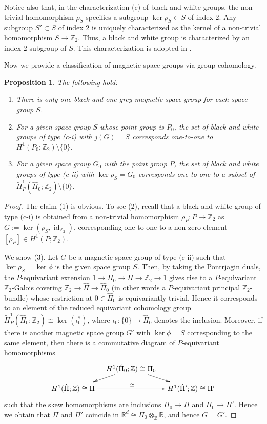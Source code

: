 \documentclass[11pt]{amsart}
\theoremstyle{definition}
\theoremstyle{plain}
\newtheorem{prp}[equation]{Proposition}
\theoremstyle{remark}
\DeclareMathOperator{\id}{id}
\newcommand{\bR}{\mathbb{R}}
\newcommand{\bZ}{\mathbb{Z}}
\begin{document}
Notice also that, in the characterization (c) of black and white groups, the non-trivial homomorphism $\rho_{S}$ specifies a subgroup $\ker\rho_S \subset S$ of index $2$. Any subgroup $S' \subset S$ of index $2$ is uniquely characterized as the kernel of a non-trivial homomorphism $S \to \bZ_2$. Thus, a black and white group is characterized by an index $2$ subgroup of $S$. This characterization is adopted in \cite{schwarzenbergerColourSymmetry1984}.

Now we provide a classification of magnetic space groups via group cohomology. 

\begin{prp}\label{prop:magnetic.class}
The following hold:
\begin{enumerate}
    \item There is only one black and one grey magnetic space group for each space group $S$.
    \item For a given space group $S$ whose point group is $P_0$, the set of black and white groups of type (c-i) with $j(G)=S$ corresponds one-to-one to $H^1(P_0;\bZ_2) \setminus \{ 0 \} $. 
    \item For a given space group $G_0$ with the point group $P$, the set of black and white groups of type (c-ii) with $\ker \rho_S =G_0$ corresponds one-to-one to a subset of $\tilde{H}^1_P(\hat{\Pi}_0; \bZ_2)\setminus \{0\}$.
\end{enumerate}
\end{prp}
\begin{proof}
The claim (1) is obvious. To see (2), recall that a black and white group of type (c-i) is obtained from a non-trivial homomorphism $\rho_P \colon P \to \bZ_2$ as $G:=\ker (\rho_S, \id_{\bZ_2})$, corresponding one-to-one to a non-zero element $[\rho_P] \in H^1(P;\bZ_2)$.

We show (3). Let $G$ be a magnetic space group of type (c-ii) such that $\ker \rho_S = \ker \phi $ is the given space group $S$. 
Then, by taking the Pontrjagin duals, the $P$-equivariant extension $1 \to \Pi_0 \to \Pi \to \bZ_2 \to 1$ gives rise to a $P$-equivariant $\bZ_2$-Galois covering $\bZ_2 \to \hat{\Pi}\to \hat{\Pi}_0$ (in other words a $P$-equivariant principal $\bZ_2$-bundle) whose restriction at $0 \in \hat{\Pi}_0$ is equivariantly trivial. Hence it corresponds to an element of the reduced equivariant cohomology group $\tilde{H}^1_P(\hat{\Pi}_0;\bZ_2) \cong \ker (\iota_0^*)$, where $\iota_0 \colon \{ 0\} \to \hat{\Pi}_0$ denotes the inclusion. Moreover, if there is another magnetic space group $G'$ with $\ker \phi =S$ corresponding to the same element, then there is a commutative diagram of $P$-equivariant homomorphisms
\[
\xymatrix@R=1em@C=1em{
&H^{1}(\hat{\Pi}_0;\bZ) \cong \Pi_0 \ar[ld] \ar[rd] &\\
H^{1}(\hat{\Pi};\bZ) \cong \Pi \ar[rr]^{\cong} &&  H^{1}(\hat{\Pi}'; \bZ) \cong \Pi'}
\]
such that the skew homomorphisms are inclusions $\Pi_0 \to \Pi$ and $\Pi_0 \to \Pi' $. Hence we obtain that $\Pi$ and $\Pi'$ coincide in $\bR^d \cong \Pi_0 \otimes _\bZ \bR$, and hence $G=G'$.
\end{proof}
\end{document}
